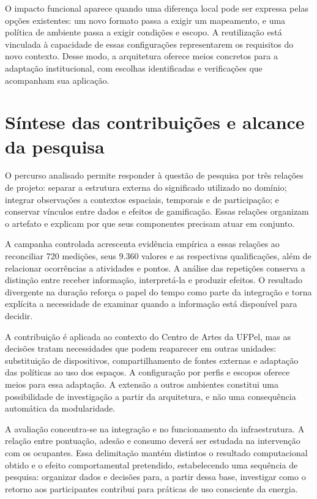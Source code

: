 \documentclass[tcc,capa]{texufpel}
\begin{document}
O impacto funcional aparece quando uma diferença local pode ser expressa pelas opções existentes: um novo formato passa a exigir um mapeamento, e uma política de ambiente passa a exigir condições e escopo. A reutilização está vinculada à capacidade de essas configurações representarem os requisitos do novo contexto. Desse modo, a arquitetura oferece meios concretos para a adaptação institucional, com escolhas identificadas e verificações que acompanham sua aplicação.

\section{Síntese das contribuições e alcance da pesquisa}
O percurso analisado permite responder à questão de pesquisa por três relações de projeto: separar a estrutura externa do significado utilizado no domínio; integrar observações a contextos espaciais, temporais e de participação; e conservar vínculos entre dados e efeitos de gamificação. Essas relações organizam o artefato e explicam por que seus componentes precisam atuar em conjunto.

A campanha controlada acrescenta evidência empírica a essas relações ao reconciliar 720 medições, seus 9.360 valores e as respectivas qualificações, além de relacionar ocorrências a atividades e pontos. A análise das repetições conserva a distinção entre receber informação, interpretá-la e produzir efeitos. O resultado divergente na duração reforça o papel do tempo como parte da integração e torna explícita a necessidade de examinar quando a informação está disponível para decidir.

A contribuição é aplicada ao contexto do Centro de Artes da UFPel, mas as decisões tratam necessidades que podem reaparecer em outras unidades: substituição de dispositivos, compartilhamento de fontes externas e adaptação das políticas ao uso dos espaços. A configuração por perfis e escopos oferece meios para essa adaptação. A extensão a outros ambientes constitui uma possibilidade de investigação a partir da arquitetura, e não uma consequência automática da modularidade.

A avaliação concentra-se na integração e no funcionamento da infraestrutura. A relação entre pontuação, adesão e consumo deverá ser estudada na intervenção com os ocupantes. Essa delimitação mantém distintos o resultado computacional obtido e o efeito comportamental pretendido, estabelecendo uma sequência de pesquisa: organizar dados e decisões para, a partir dessa base, investigar como o retorno aos participantes contribui para práticas de uso consciente da energia.
\end{document}

